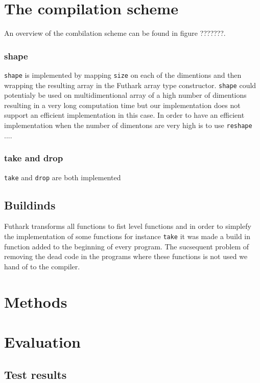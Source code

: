 \documentclass[11pt]{article}
\begin{document}
\section{The compilation scheme}
An overview of the combilation scheme can be found in figure ???????. 

\subsubsection{shape}
\verb|shape| is implemented by mapping \verb|size| on each of the dimentions and then wrapping the resulting array in the Futhark array type constructor. 
\verb|shape| could potentialy be used on multidimentional array of a high number of dimentions resulting in a very long computation time but our implementation does not support an efficient implementation in this case. In order to have an efficient implementation when the number of dimentons are very high is to use \verb|reshape| .... \\

\subsubsection{take and drop}
\verb|take| and \verb|drop| are both implemented

\subsection{Buildinds}
Futhark transforms all functions to fist level functions and in order to simplefy the implementation of some functions for instance \verb|take| it was made a build in function added to the beginning of every program. The sucsequent problem of removing the dead code in the programs where these functions is not used we hand of to the compiler.



\section{Methods}
\section{Evaluation}
\subsection{Test results}
\end{document}
